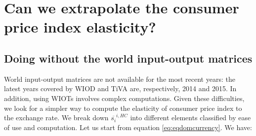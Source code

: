 \documentclass[11pt,a4paper]{article}
\begin{document}
%
%
%
%
%

\section{Can we extrapolate the consumer price index elasticity?}
\label{sec:extrapo}
\subsection{Doing without the world input-output matrices}
World input-output matrices are not available for the most recent years: the latest years covered by WIOD and TiVA are, respectively, 2014 and 2015. 
In addition, using WIOTs involves complex computations.
Given these difficulties, we look for a simpler way to compute the elasticity of consumer price index to the exchange rate.
We break down $\overline{s_{i}}^{i,HC}$ into different elements classified by ease of use and computation. 
Let us start from equation \ref{eq:eqdomcurrency}. 
We have:
\end{document}
